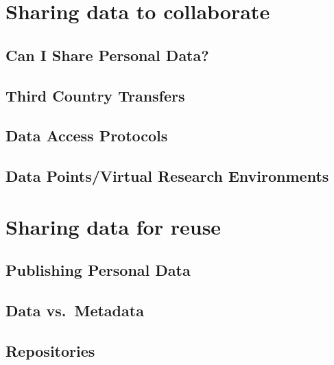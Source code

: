 \documentclass[
]{book}
\begin{document}
\hypertarget{data-sharing-collaboration}{%
\chapter{Sharing data to collaborate}\label{data-sharing-collaboration}}

\hypertarget{can-i-share-personal-data}{%
\section{Can I Share Personal Data?}\label{can-i-share-personal-data}}

\hypertarget{third-country-transfers}{%
\section{Third Country Transfers}\label{third-country-transfers}}

\hypertarget{data-access-protocols}{%
\section{Data Access Protocols}\label{data-access-protocols}}

\hypertarget{data-pointsvirtual-research-environments}{%
\section{Data Points/Virtual Research Environments}\label{data-pointsvirtual-research-environments}}

\hypertarget{data-sharing-reuse}{%
\chapter{Sharing data for reuse}\label{data-sharing-reuse}}

\hypertarget{publishing-personal-data}{%
\section{Publishing Personal Data}\label{publishing-personal-data}}

\hypertarget{data-vs.-metadata}{%
\section{Data vs.~Metadata}\label{data-vs.-metadata}}

\hypertarget{repositories}{%
\section{Repositories}\label{repositories}}
\end{document}
